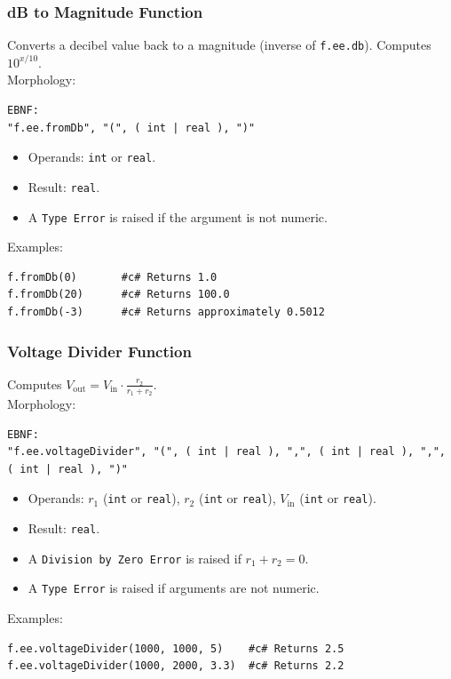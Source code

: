 \subsubsection{dB to Magnitude Function}
Converts a decibel value back to a magnitude (inverse of \texttt{f.ee.db}). Computes $10^{x/10}$. \\
Morphology:
\begin{verbatim}
EBNF:
"f.ee.fromDb", "(", ( int | real ), ")"
\end{verbatim}
\begin{itemize}
\item Operands: \texttt{int} or \texttt{real}.
\item Result: \texttt{real}.
\item A \texttt{Type Error} is raised if the argument is not numeric.
\end{itemize}
Examples:
\begin{verbatim}
f.fromDb(0)       #c# Returns 1.0
f.fromDb(20)      #c# Returns 100.0
f.fromDb(-3)      #c# Returns approximately 0.5012
\end{verbatim}

\subsubsection{Voltage Divider Function}
Computes $V_{\text{out}} = V_{\text{in}} \cdot \frac{r_2}{r_1 + r_2}$. \\
Morphology:
\begin{verbatim}
EBNF:
"f.ee.voltageDivider", "(", ( int | real ), ",", ( int | real ), ",", ( int | real ), ")"
\end{verbatim}
\begin{itemize}
\item Operands: $r_1$ (\texttt{int} or \texttt{real}), $r_2$ (\texttt{int} or \texttt{real}), $V_{\text{in}}$ (\texttt{int} or \texttt{real}).
\item Result: \texttt{real}.
\item A \texttt{Division by Zero Error} is raised if $r_1 + r_2 = 0$.
\item A \texttt{Type Error} is raised if arguments are not numeric.
\end{itemize}
Examples:
\begin{verbatim}
f.ee.voltageDivider(1000, 1000, 5)    #c# Returns 2.5
f.ee.voltageDivider(1000, 2000, 3.3)  #c# Returns 2.2
\end{verbatim}

